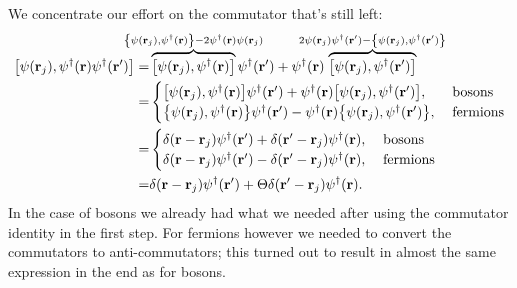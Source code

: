 \documentclass[11pt,letter, swedish, english
]{article}
\begin{document}
We concentrate our effort on the commutator that's still left:
\begin{equation}
\begin{aligned}
\comm{\psi(\vb{r}_j)}{\psi^\dagger(\vb{r})\psi^\dagger(\vb{r}')}
=&\hspace{-20pt}\overbrace{
\comm{\psi(\vb{r}_j)}{\psi^\dagger(\vb{r})}
}^{\acomm{\psi(\vb{r}_j)}{\psi^\dagger(\vb{r})}-2\psi^\dagger(\vb{r})\psi(\vb{r}_j)}
\hspace{-20pt}\psi^\dagger(\vb{r}')
+\psi^\dagger(\vb{r})
\hspace{-20pt}\overbrace{
\comm{\psi(\vb{r}_j)}{\psi^\dagger(\vb{r}')}
}^{2\psi(\vb{r}_j)\psi^\dagger(\vb{r}')-\acomm{\psi(\vb{r}_j)}{\psi^\dagger(\vb{r}')}}
\\%
=&
\begin{cases}
\comm{\psi(\vb{r}_j)}{\psi^\dagger(\vb{r})}\psi^\dagger(\vb{r}')
+\psi^\dagger(\vb{r})\comm{\psi(\vb{r}_j)}{\psi^\dagger(\vb{r}')}
,&\text{bosons}\\
\acomm{\psi(\vb{r}_j)}{\psi^\dagger(\vb{r})}\psi^\dagger(\vb{r}')
-\psi^\dagger(\vb{r})\acomm{\psi(\vb{r}_j)}{\psi^\dagger(\vb{r}')}
,\;&\text{fermions}
\end{cases}\\
=&
\begin{cases}
\delta(\vb{r}-\vb{r}_j) \psi^\dagger(\vb{r}')
+\delta(\vb{r}'-\vb{r}_j)\psi^\dagger(\vb{r})
,&\text{bosons}\\
\delta(\vb{r}-\vb{r}_j) \psi^\dagger(\vb{r}')
-\delta(\vb{r}'-\vb{r}_j)\psi^\dagger(\vb{r})
,\;&\text{fermions}
\end{cases}\\
=&
\delta(\vb{r}-\vb{r}_j) \psi^\dagger(\vb{r}')
+\Theta\delta(\vb{r}'-\vb{r}_j)\psi^\dagger(\vb{r}).
\end{aligned}
\end{equation}
In the case of bosons we already had what we needed after using the
commutator identity in the first step. For fermions however we needed
to convert the commutators to anti-commutators; this turned out to
result in almost the same expression in the end as for bosons.

\end{document}
